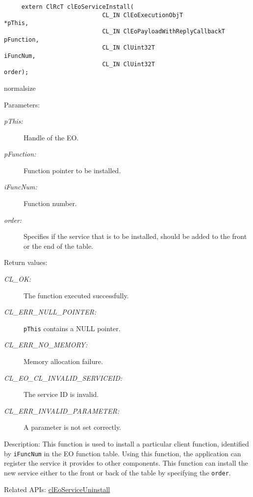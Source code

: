 \begin{flushleft}
\begin{Desc}
\footnotesize\begin{verbatim}     extern ClRcT clEoServiceInstall(
                 			CL_IN ClEoExecutionObjT              *pThis,
                 			CL_IN ClEoPayloadWithReplyCallbackT  pFunction,
                 			CL_IN ClUint32T                      iFuncNum,
                 			CL_IN ClUint32T                      order);
\end{verbatim}
  normalsize
\end{Desc}
\begin{Desc}
\item[Parameters:]
\begin{description}
\item[{\em p\-This:}]Handle of the EO. 
\item[{\em p\-Function:}]Function pointer to be installed. 
\item[{\em i\-Func\-Num:}]Function number. 
\item[{\em order:}]Specifies if the service that is to be installed, should be added to the front or the end of the table.\end{description}
\end{Desc}
\begin{Desc}
\item[Return values:]
\begin{description}
\item[{\em CL\_\-OK:}]The function executed successfully. 
\item[{\em CL\_\-ERR\_\-NULL\_\-POINTER:}]{\tt{pThis}} contains a NULL pointer. 
\item[{\em CL\_\-ERR\_\-NO\_\-MEMORY:}]Memory allocation failure. 
\item[{\em CL\_\-EO\_\-CL\_\-INVALID\_\-SERVICEID:}]The service ID is invalid.
\item[{\em CL\_\-ERR\_\-INVALID\_\-PARAMETER:}]A parameter is not set correctly.\end{description}
\end{Desc}
\begin{Desc}
\item[Description:]This function is used to install a particular client function, identified by {\tt{i\-Func\-Num}} in the EO function table. Using this function,
the application can register the service it provides to other components. This function can install the new service either to the front or back of 
the table by specifying the {\tt{order}}.\end{Desc}
\begin{Desc}
\item[Related APIs:]\hyperlink{pageeo111}{cl\-Eo\-Service\-Uninstall} \end{Desc}




\end{flushleft}
